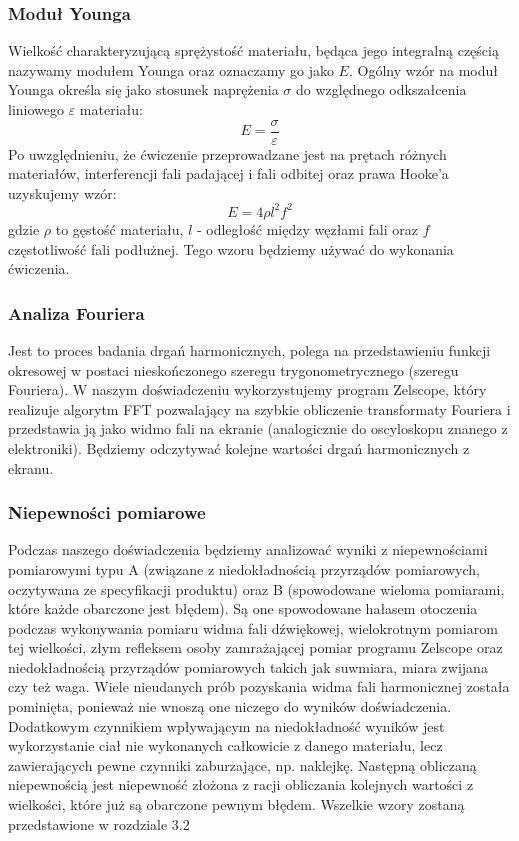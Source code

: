 \documentclass[a4paper,12pts]{article}
\begin{document}
\subsubsection{Moduł Younga}
Wielkość charakteryzującą sprężystość materiału, będąca jego integralną częścią nazywamy modułem Younga oraz oznaczamy go jako $E$. Ogólny wzór na moduł Younga określa się jako stosunek naprężenia $\sigma$ do względnego odkszałcenia liniowego $\varepsilon$ materiału:
\begin{equation}
E = \frac{\sigma}{\varepsilon}
\end{equation}
Po uwzględnieniu, że ćwiczenie przeprowadzane jest na prętach różnych materiałów, interferencji fali padającej i fali odbitej oraz prawa Hooke'a uzyskujemy wzór:
\begin{equation}
E = 4 \rho l^2 f^2
\end{equation}
gdzie $\rho$ to gęstość materiału, $l$ - odległość między węzłami fali oraz $f$ częstotliwość fali podłużnej. Tego wzoru będziemy używać do wykonania ćwiczenia.


\subsubsection{Analiza Fouriera}
Jest to proces badania drgań harmonicznych, polega na przedstawieniu funkcji okresowej w postaci nieskończonego szeregu trygonometrycznego (szeregu Fouriera). W naszym doświadczeniu wykorzystujemy program Zelscope, który realizuje algorytm FFT pozwalający na szybkie obliczenie transformaty Fouriera i przedstawia ją jako widmo fali na ekranie (analogicznie do oscyloskopu znanego z elektroniki). Będziemy odczytywać kolejne wartości drgań harmonicznych z ekranu.

\subsubsection{Niepewności pomiarowe}
Podczas naszego doświadczenia będziemy analizować wyniki z niepewnościami pomiarowymi typu A (związane z niedokładnością przyrządów pomiarowych, oczytywana ze specyfikacji produktu) oraz B (spowodowane wieloma pomiarami, które każde obarczone jest błędem). Są one spowodowane hałasem otoczenia podczas wykonywania pomiaru widma fali dźwiękowej, wielokrotnym pomiarom tej wielkości, złym refleksem osoby zamrażającej pomiar programu Zelscope oraz niedokładnością przyrządów pomiarowych takich jak suwmiara, miara zwijana czy też waga. Wiele nieudanych prób pozyskania widma fali harmonicznej została pominięta, ponieważ nie wnoszą one niczego do wyników doświadczenia. Dodatkowym czynnikiem wpływającym na niedokładność wyników jest wykorzystanie ciał nie wykonanych całkowicie z danego materiału, lecz zawierających pewne czynniki zaburzające, np. naklejkę. Następną obliczaną niepewnością jest niepewność złożona z racji obliczania kolejnych wartości z wielkości, które już są obarczone pewnym błędem. Wszelkie wzory zostaną przedstawione w rozdziale 3.2
\end{document}
